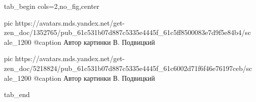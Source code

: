  
 
 
 
 

\ifcmt
  tab_begin cols=2,no_fig,center

     pic https://avatars.mds.yandex.net/get-zen_doc/1352765/pub_61c531b07d887c5335e4445f_61c5ff8500083e7d9f5e84b4/scale_1200
		 @caption Автор картинки В. Подвицкий

		 pic https://avatars.mds.yandex.net/get-zen_doc/5218824/pub_61c531b07d887c5335e4445f_61c6002d71f6f46e76197ceb/scale_1200
		 @caption Автор картинки В. Подвицкий

  tab_end
\fi

